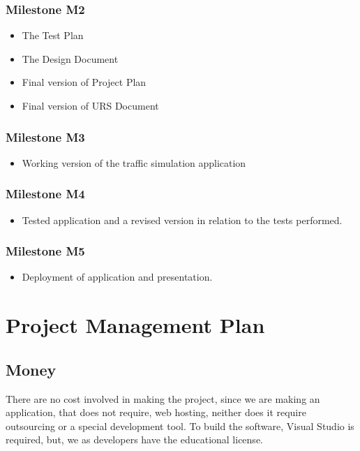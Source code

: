 \documentclass[a4paper,11pt]{article}
\begin{document}
      		\subsubsection{Milestone M2}
      		\begin{itemize}
      		
      			\item The Test Plan
      			\item The Design Document 
      			\item Final version of Project Plan
      			\item Final version of URS Document 
      		
      	\end{itemize}
      	
      	\subsubsection{Milestone M3}
      	\begin{itemize}
      		\item Working version of the traffic simulation application 
      		
      	\end{itemize}
      		\subsubsection{Milestone M4}
      		\begin{itemize}
      			\item Tested application and a revised version in relation to the tests performed.
      			
      		\end{itemize}
      		
      
      	\subsubsection{Milestone M5}
      	\begin{itemize}
      		\item  Deployment of application and presentation.
      		
      	\end{itemize}
      	
      	\section{Project Management Plan }
      	\subsection{Money}
      	There are no cost involved in making the project, since we are making an application, that does not require, web hosting, neither does it require outsourcing or a special development tool. To build the software, Visual Studio is required, but, we as developers have the educational license.
      	
\end{document}
